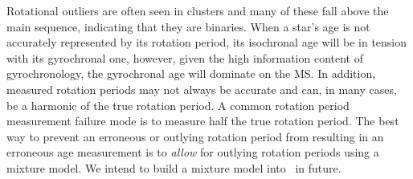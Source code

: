 Rotational outliers are often seen in clusters \citep[see \eg][]{douglas2016,
rebull2016, douglas2017, rebull2017} and many of these fall above the main
sequence, indicating that they are binaries.
When a star's age is not accurately represented by its rotation period, its
isochronal age will be in tension with its gyrochronal one, however, given the
high information content of gyrochronology, the gyrochronal age will dominate
on the MS.
In addition, measured rotation periods may not always be accurate and can, in
many cases, be a harmonic of the true rotation period.
A common rotation period measurement failure mode is to measure half the true
rotation period.
The best way to prevent an erroneous or outlying rotation period from
resulting in an erroneous age measurement is to {\it allow} for outlying
rotation periods using a mixture model.
We intend to build a mixture model into \sd\ in future.


